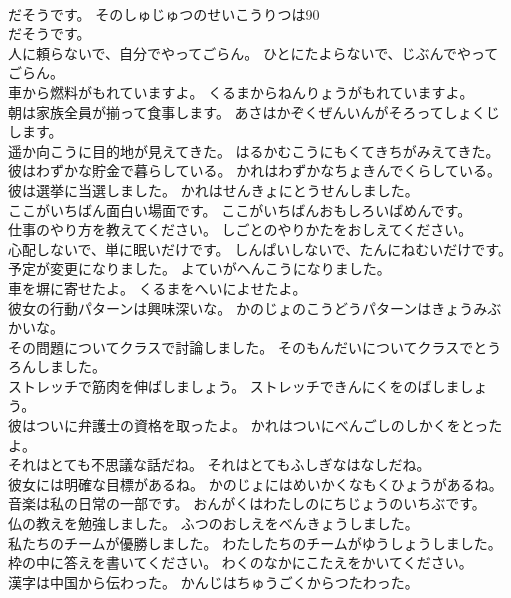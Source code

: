 \documentclass[8pt]{extreport}
\begin{document}
\begin{CJK}{UTF8}{min}
\\	だそうです。	そのしゅじゅつのせいこうりつは90
\\	だそうです。 
\\	人に頼らないで、自分でやってごらん。	ひとにたよらないで、じぶんでやってごらん。 
\\	車から燃料がもれていますよ。	くるまからねんりょうがもれていますよ。 
\\	朝は家族全員が揃って食事します。	あさはかぞくぜんいんがそろってしょくじします。 
\\	遥か向こうに目的地が見えてきた。	はるかむこうにもくてきちがみえてきた。 
\\	彼はわずかな貯金で暮らしている。	かれはわずかなちょきんでくらしている。 
\\	彼は選挙に当選しました。	かれはせんきょにとうせんしました。 
\\	ここがいちばん面白い場面です。	ここがいちばんおもしろいばめんです。 
\\	仕事のやり方を教えてください。	しごとのやりかたをおしえてください。 
\\	心配しないで、単に眠いだけです。	しんぱいしないで、たんにねむいだけです。 
\\	予定が変更になりました。	よていがへんこうになりました。 
\\	車を塀に寄せたよ。	くるまをへいによせたよ。 
\\	彼女の行動パターンは興味深いな。	かのじょのこうどうパターンはきょうみぶかいな。 
\\	その問題についてクラスで討論しました。	そのもんだいについてクラスでとうろんしました。 
\\	ストレッチで筋肉を伸ばしましょう。	ストレッチできんにくをのばしましょう。 
\\	彼はついに弁護士の資格を取ったよ。	かれはついにべんごしのしかくをとったよ。 
\\	それはとても不思議な話だね。	それはとてもふしぎなはなしだね。 
\\	彼女には明確な目標があるね。	かのじょにはめいかくなもくひょうがあるね。 
\\	音楽は私の日常の一部です。	おんがくはわたしのにちじょうのいちぶです。 
\\	仏の教えを勉強しました。	ふつのおしえをべんきょうしました。 
\\	私たちのチームが優勝しました。	わたしたちのチームがゆうしょうしました。 
\\	枠の中に答えを書いてください。	わくのなかにこたえをかいてください。 
\\	漢字は中国から伝わった。	かんじはちゅうごくからつたわった。 

\end{CJK}
\end{document}
